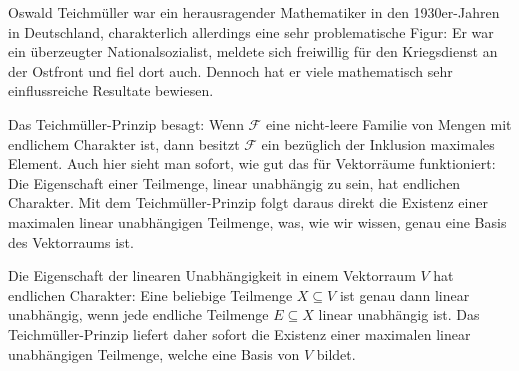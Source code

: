 \begin{spoken-clean}[01:06:34 - 01:08:33]
Oswald Teichmüller war ein herausragender Mathematiker in den 1930er-Jahren in Deutschland, charakterlich allerdings eine sehr problematische Figur: Er war ein überzeugter Nationalsozialist, meldete sich freiwillig für den Kriegsdienst an der Ostfront und fiel dort auch. Dennoch hat er viele mathematisch sehr einflussreiche Resultate bewiesen.

Das Teichmüller-Prinzip besagt: Wenn $\mathcal{F}$ eine nicht-leere Familie von Mengen mit endlichem Charakter ist, dann besitzt $\mathcal{F}$ ein bezüglich der Inklusion maximales Element. Auch hier sieht man sofort, wie gut das für Vektorräume funktioniert: Die Eigenschaft einer Teilmenge, linear unabhängig zu sein, hat endlichen Charakter. Mit dem Teichmüller-Prinzip folgt daraus direkt die Existenz einer maximalen linear unabhängigen Teilmenge, was, wie wir wissen, genau eine Basis des Vektorraums ist.
\end{spoken-clean}

\begin{math-stroke}


\begin{explanation-of-steps}
Die Eigenschaft der linearen Unabhängigkeit in einem Vektorraum $V$ hat endlichen Charakter:
Eine beliebige Teilmenge $X \subseteq V$ ist genau dann linear unabhängig, wenn jede endliche Teilmenge $E \subseteq X$ linear unabhängig ist. Das Teichmüller-Prinzip liefert daher sofort die Existenz einer maximalen linear unabhängigen Teilmenge, welche eine Basis von $V$ bildet.
\end{explanation-of-steps}
\end{math-stroke}


